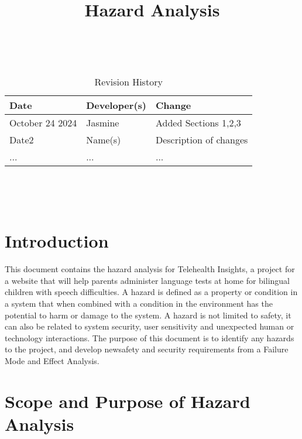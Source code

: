 \documentclass{article}
\title{Hazard Analysis\\\progname}
\author{\authname}
\date{}
\begin{document}
\maketitle
\thispagestyle{empty}

~\newpage


\begin{table}[hp]
\caption{Revision History} \label{TblRevisionHistory}
\begin{tabularx}{\textwidth}{llX}
\toprule
\textbf{Date} & \textbf{Developer(s)} & \textbf{Change}\\
\midrule
October 24 2024 & Jasmine & Added Sections 1,2,3\\
Date2 & Name(s) & Description of changes\\
... & ... & ...\\
\bottomrule
\end{tabularx}
\end{table}

~\newpage

\tableofcontents

~\newpage


\section{Introduction}

\hspace{1.5em} This document contains the hazard analysis for Telehealth Insights, a project for a website that will help 
parents administer language tests at home for bilingual children with speech difficulties. A hazard is defined as a 
property or condition in a system that when combined with a condition in the environment has the potential to harm or 
damage to the system. A hazard is not limited to safety, it can also be related to system security, user sensitivity and 
unexpected human or technology interactions. The purpose of this document is to identify any hazards to the project, and 
develop newsafety and security requirements from a Failure Mode and Effect Analysis.

\section{Scope and Purpose of Hazard Analysis}
\end{document}
